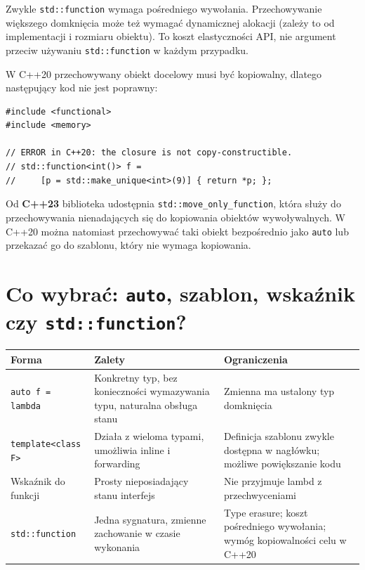Zwykle \texttt{std::function} wymaga pośredniego wywołania. Przechowywanie
większego domknięcia może też wymagać dynamicznej alokacji (zależy to
od implementacji i rozmiaru obiektu). To koszt elastyczności API, nie
argument przeciw używaniu \texttt{std::function} w każdym przypadku.

W C++20 przechowywany obiekt docelowy musi być kopiowalny, dlatego
następujący kod nie jest poprawny:

\begin{lstlisting}
#include <functional>
#include <memory>

// ERROR in C++20: the closure is not copy-constructible.
// std::function<int()> f =
//     [p = std::make_unique<int>(9)] { return *p; };
\end{lstlisting}

Od \textbf{C++23} biblioteka udostępnia
\texttt{std::move\_only\_function}, która służy do przechowywania
nienadających się do kopiowania obiektów wywoływalnych. W C++20
można natomiast przechowywać taki obiekt bezpośrednio jako \texttt{auto}
lub przekazać go do szablonu, który nie wymaga kopiowania.

\section{Co wybrać: \texttt{auto}, szablon, wskaźnik czy \texttt{std::function}?}
\label{sec:lambda-choice}

\begin{center}
\begin{tabular}{|p{3.0cm}|p{4.4cm}|p{5.0cm}|}
\hline
\textbf{Forma} & \textbf{Zalety} & \textbf{Ograniczenia} \\
\hline
\texttt{auto f = lambda} & Konkretny typ, bez konieczności wymazywania typu, naturalna obsługa stanu & Zmienna ma ustalony typ domknięcia \\
\hline
\texttt{template<class F>} & Działa z wieloma typami, umożliwia inline i forwarding & Definicja szablonu zwykle dostępna w nagłówku; możliwe powiększanie kodu \\
\hline
Wskaźnik do funkcji & Prosty nieposiadający stanu interfejs & Nie przyjmuje lambd z przechwyceniami \\
\hline
\texttt{std::function} & Jedna sygnatura, zmienne zachowanie w czasie wykonania & Type erasure; koszt pośredniego wywołania; wymóg kopiowalności celu w C++20 \\
\hline
\end{tabular}
\end{center}

